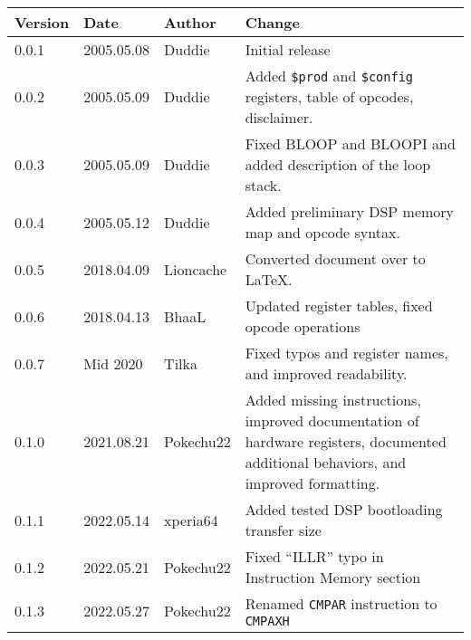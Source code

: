 \documentclass[oneside,english,a4paper,10pt,oneside,openany,final]{memoir}
\newcommand{\Register}[1]{\texttt{#1}}
\begin{document}
\begin{table}[htb]
\centering
\begin{tabular}{|p{.5in}|p{.75in}|p{.75in}|p{3.5in}|}
\hline
\textbf{Version} & \textbf{Date} & \textbf{Author} & \textbf{Change}                                                                          \\ \hline
0.0.1            & 2005.05.08    & Duddie          & Initial release                                                                          \\ \hline
0.0.2            & 2005.05.09    & Duddie          & Added \Register{\$prod} and \Register{\$config} registers, table of opcodes, disclaimer. \\ \hline
0.0.3            & 2005.05.09    & Duddie          & Fixed BLOOP and BLOOPI and added description of the loop stack.                          \\ \hline
0.0.4            & 2005.05.12    & Duddie          & Added preliminary DSP memory map and opcode syntax.                                      \\ \hline
0.0.5            & 2018.04.09    & Lioncache       & Converted document over to LaTeX.                                                        \\ \hline
0.0.6            & 2018.04.13    & BhaaL           & Updated register tables, fixed opcode operations                                         \\ \hline
0.0.7            & Mid 2020      & Tilka           & Fixed typos and register names, and improved readability.                                \\ \hline
0.1.0            & 2021.08.21    & Pokechu22       & Added missing instructions, improved documentation of hardware registers, documented additional behaviors, and improved formatting. \\ \hline
0.1.1            & 2022.05.14    & xperia64        & Added tested DSP bootloading transfer size                                               \\ \hline
0.1.2            & 2022.05.21    & Pokechu22       & Fixed ``ILLR'' typo in Instruction Memory section                                        \\ \hline
0.1.3            & 2022.05.27    & Pokechu22       & Renamed \texttt{CMPAR} instruction to \texttt{CMPAXH}                                    \\ \hline
\end{tabular}
\end{table}
\end{document}
